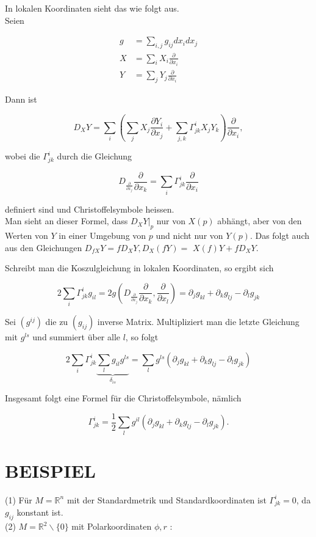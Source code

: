 \documentclass[10pt]{article}
\begin{document}
In lokalen Koordinaten sieht das wie folgt aus.\\
Seien

$$
\begin{aligned}
g & =\sum_{i, j} g_{i j} d x_{i} d x_{j} \\
X & =\sum_{i} X_{i} \frac{\partial}{\partial x_{i}} \\
Y & =\sum_{j} Y_{j} \frac{\partial}{\partial x_{i}}
\end{aligned}
$$

Dann ist

$$
D_{X} Y=\sum_{i}\left(\sum_{j} X_{j} \frac{\partial Y_{i}}{\partial x_{j}}+\sum_{j, k} \Gamma_{j k}^{i} X_{j} Y_{k}\right) \frac{\partial}{\partial x_{i}},
$$

wobei die $\Gamma_{j k}^{i}$ durch die Gleichung

$$
D_{\frac{\partial}{\partial x_{j}}} \frac{\partial}{\partial x_{k}}=\sum_{i} \Gamma_{j k}^{i} \frac{\partial}{\partial x_{i}}
$$

definiert sind und Christoffelsymbole heissen.\\
Man sieht an dieser Formel, dass $\left.D_{X} Y\right|_{p}$ nur von $X(p)$ abhängt, aber von den Werten von $Y$ in einer Umgebung von $p$ und nicht nur von $Y(p)$. Das folgt auch aus den Gleichungen $D_{f X} Y=f D_{X} Y, D_{X}(f Y)=$ $X(f) Y+f D_{X} Y$.

Schreibt man die Koszulgleichung in lokalen Koordinaten, so ergibt sich

$$
2 \sum_{i} \Gamma_{j k}^{i} g_{i l}=2 g\left(D_{\frac{\partial}{\partial x_{j}}} \frac{\partial}{\partial x_{k}}, \frac{\partial}{\partial x_{l}}\right)=\partial_{j} g_{k l}+\partial_{k} g_{l j}-\partial_{l} g_{j k}
$$

Sei $\left(g^{i j}\right)$ die zu $\left(g_{i j}\right)$ inverse Matrix. Multipliziert man die letzte Gleichung mit $g^{l s}$ und summiert über alle $l$, so folgt

$$
2 \sum_{i} \Gamma_{j k}^{i} \underbrace{\sum_{l} g_{i l} g^{l s}}_{\delta_{i s}}=\sum_{l} g^{l s}\left(\partial_{j} g_{k l}+\partial_{k} g_{l j}-\partial_{l} g_{j k}\right)
$$

Insgesamt folgt eine Formel für die Christoffelsymbole, nämlich

$$
\Gamma_{j k}^{i}=\frac{1}{2} \sum_{l} g^{i l}\left(\partial_{j} g_{k l}+\partial_{k} g_{l j}-\partial_{l} g_{j k}\right) .
$$

\section*{BEISPIEL}
(1) Für $M=\mathbb{R}^{n}$ mit der Standardmetrik und Standardkoordinaten ist $\Gamma_{j k}^{i}=0$, da $g_{i j}$ konstant ist.\\
(2) $M=\mathbb{R}^{2} \backslash\{0\}$ mit Polarkoordinaten $\phi, r$ :
\end{document}

